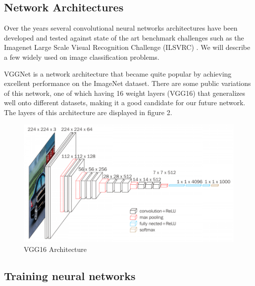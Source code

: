 \documentclass[journal,compsoc]{IEEEtran}
\begin{document}
\subsection{Network Architectures}
Over the years several convolutional neural networks architectures have been developed and tested against state of the art benchmark challenges such as the Imagenet Large Scale Visual Recognition Challenge (ILSVRC) \cite{ilsvrc}. We will describe a few widely used on image classification problems. \par
VGGNet is a network architecture that became quite popular by achieving excellent performance on the ImageNet dataset. There are some public variations of this network, one of which having 16 weight layers (VGG16) that generalizes well onto different datasets, making it a good candidate for our future network. The layers of this architecture are displayed in figure 2.
\begin{figure}[h]
  \centering
    \includegraphics[scale=0.5, width=\linewidth]{figures/vgg16.png}
  \caption{VGG16 Architecture}
\end{figure}
\subsection{Training neural networks}
\end{document}
